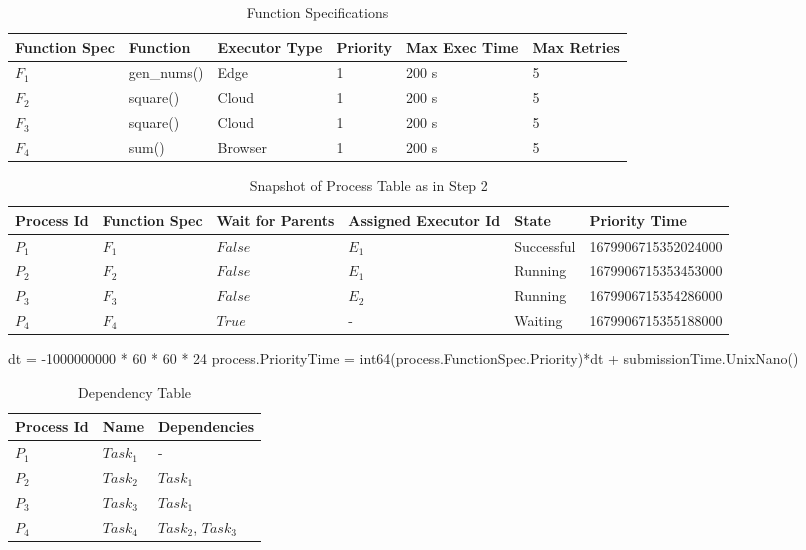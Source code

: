 \documentclass{article}
\begin{document}
\begin{table}[h]
	\caption{Function Specifications}
	\centering
	\begin{tabular}{llllll}
		\toprule
		\cmidrule(r){1-2}
        Function Spec & Function        & Executor Type & Priority & Max Exec Time & Max Retries \\
		\midrule
        $F_{1}$       & gen\_nums()     & Edge          & 1        & 200 s         & 5 \\
        $F_{2}$       & square()        & Cloud         & 1        & 200 s         & 5 \\
        $F_{3}$       & square()        & Cloud         & 1        & 200 s         & 5 \\
        $F_{4}$       & sum()           & Browser       & 1        & 200 s         & 5 \\
		\bottomrule
	\end{tabular}
	\label{tab:table}
\end{table}

\begin{table}[h]
	\caption{Snapshot of Process Table as in Step 2}
	\centering
	\begin{tabular}{llllll}
		\toprule
		\cmidrule(r){1-2}
        Process Id & Function Spec & Wait for Parents & Assigned Executor Id & State      & Priority Time \\
		\midrule
        $P_{1}$    & $F_{1}$       & $False$          & $E_{1}$              & Successful & 1679906715352024000 \\
        $P_{2}$    & $F_{2}$       & $False$          & $E_{1}$              & Running    & 1679906715353453000 \\
        $P_{3}$    & $F_{3}$       & $False$          & $E_{2}$              & Running    & 1679906715354286000 \\
        $P_{4}$    & $F_{4}$       & $True$           & -                    & Waiting    & 1679906715355188000 \\
		\bottomrule
	\end{tabular}
	\label{tab:table}
\end{table}

dt = -1000000000 * 60 * 60 * 24
process.PriorityTime = int64(process.FunctionSpec.Priority)*dt + submissionTime.UnixNano()


\begin{table}[h]
	\caption{Dependency Table}
	\centering
	\begin{tabular}{lll}
		\toprule
		\cmidrule(r){1-2}
        Process Id & Name       & Dependencies           \\
		\midrule
        $P_{1}$    & $Task_{1}$ & -                      \\
        $P_{2}$    & $Task_{2}$ & $Task_{1}$             \\
        $P_{3}$    & $Task_{3}$ & $Task_{1}$             \\
        $P_{4}$    & $Task_{4}$ & $Task_{2}$, $Task_{3}$ \\
		\bottomrule
	\end{tabular}
	\label{tab:table}
\end{table}
	
\end{document}
